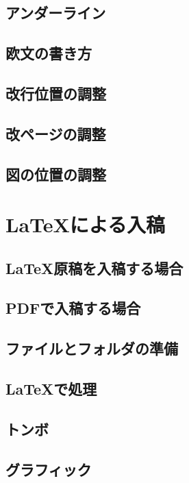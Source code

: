 \documentclass{jsbook}
\begin{document}
\section{アンダーライン}

\section{欧文の書き方}

\section{改行位置の調整}

\section{改ページの調整}

\section{図の位置の調整}

\chapter{LaTeXによる入稿}

\section{LaTeX原稿を入稿する場合}

\section{PDFで入稿する場合}

\section{ファイルとフォルダの準備}

\section{LaTeXで処理}

\section{トンボ}

\section{グラフィック}
\end{document}

